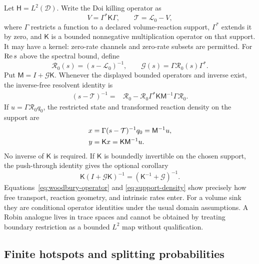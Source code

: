 \documentclass[aps,pre,reprint,amsmath,amssymb,longbibliography,floatfix]{revtex4-2}
\newcommand{\Tgen}{\mathcal T}
\newcommand{\Lfree}{\mathcal L_0}
\newcommand{\Rfree}{\mathcal R_0}
\newcommand{\Gres}{\mathcal G}
\begin{document}
Let \(\mathsf H=L^2(\mathcal D)\). Write the Doi killing operator as
\begin{equation}
V=\Gamma^*\mathsf K\Gamma,\qquad
\Tgen=\Lfree-V,
\label{eq:killed-operator}
\end{equation}
where \(\Gamma\) restricts a function to a declared volume-reaction support,
\(\Gamma^*\) extends it by zero, and \(\mathsf K\) is a bounded nonnegative
multiplication operator on that support. It may have a kernel: zero-rate
channels and zero-rate subsets are permitted. For \({\rm Re}\,s\) above the
spectral bound, define
\begin{equation}
\Rfree(s)=(s-\Lfree)^{-1},\qquad
\Gres(s)=\Gamma\Rfree(s)\Gamma^*.
\label{eq:restricted-green}
\end{equation}
Put \(\mathsf M=I+\Gres\mathsf K\). Whenever the displayed bounded operators
and inverse exist, the inverse-free resolvent identity is
\begin{align}
(s-\Tgen)^{-1}={}&\Rfree-\Rfree\Gamma^*\mathsf K
  \mathsf M^{-1}\Gamma\Rfree.
\label{eq:woodbury-operator}
\end{align}
If \(u=\Gamma\Rfree q_0\), the restricted state and transformed reaction
density on the support are
\begin{align}
x&=\Gamma(s-\Tgen)^{-1}q_0=\mathsf M^{-1}u,\notag\\
y&=\mathsf Kx=\mathsf K\mathsf M^{-1}u.
\label{eq:support-density}
\end{align}
No inverse of \(\mathsf K\) is required. If \(\mathsf K\) is boundedly
invertible on the chosen support, the push-through identity gives the optional
corollary
\begin{equation}
\mathsf K(I+\Gres\mathsf K)^{-1}
=(\mathsf K^{-1}+\Gres)^{-1}.
\label{eq:inverse-k-corollary}
\end{equation}
Equations~\eqref{eq:woodbury-operator} and \eqref{eq:support-density} show
precisely how free transport, reaction geometry, and intrinsic rates enter.
For a volume sink they are conditional operator identities under the usual
domain assumptions. A Robin analogue lives in trace spaces and cannot be
obtained by treating boundary restriction as a bounded \(L^2\) map without
qualification.

\subsection{Finite hotspots and splitting probabilities}
\label{sec:finite-green}
\end{document}
